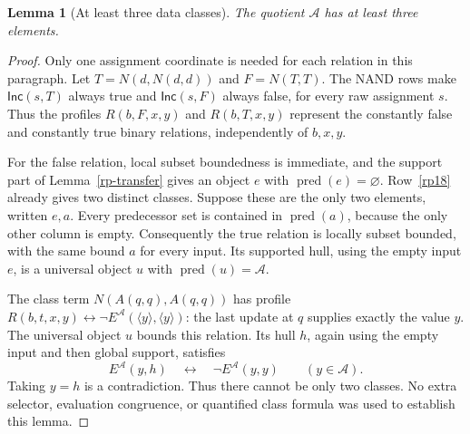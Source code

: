 \documentclass[11pt]{article}
\newtheorem{lemma}[theorem]{Lemma}
\newcommand{\Inc}{\mathsf{Inc}}
\newcommand{\cl}[1]{\langle#1\rangle}
\begin{document}
\begin{lemma}[At least three data classes]\label{rp-three}
The quotient $\mathcal A$ has at least three elements.
\end{lemma}
\begin{proof}
Only one assignment coordinate is needed for each relation in this
paragraph. Let $T=N(d,N(d,d))$ and $F=N(T,T)$. The NAND rows make
$\Inc(s,T)$ always true and $\Inc(s,F)$ always false, for every raw
assignment $s$. Thus the profiles $R(b,F,x,y)$ and $R(b,T,x,y)$
represent the constantly false and constantly true binary relations,
independently of $b,x,y$.

For the false relation, local subset boundedness is immediate, and the
support part of Lemma~\ref{rp-transfer} gives an object $e$ with
$\operatorname{pred}(e)=\varnothing$. Row~\ref{rp18} already gives
two distinct classes. Suppose these are the only two elements, written
$e,a$. Every predecessor set is contained in
$\operatorname{pred}(a)$, because the only other column is empty.
Consequently the true relation is locally subset bounded, with the
same bound $a$ for every input. Its supported hull, using the empty
input $e$, is a universal object $u$ with
$\operatorname{pred}(u)=\mathcal A$.

The class term $N(A(q,q),A(q,q))$ has profile
$R(b,t,x,y)\leftrightarrow\neg E^{\mathcal A}(\cl y,\cl y)$:
the last update at $q$ supplies exactly the value $y$. The universal
object $u$ bounds this relation. Its hull $h$, again using the empty
input and then global support, satisfies
\[
 E^{\mathcal A}(y,h)\quad\longleftrightarrow\quad
 \neg E^{\mathcal A}(y,y)
 \qquad(y\in\mathcal A).
\]
Taking $y=h$ is a contradiction. Thus there cannot be only two classes.
No extra selector, evaluation congruence, or quantified class formula
was used to establish this lemma.
\end{proof}
\end{document}
